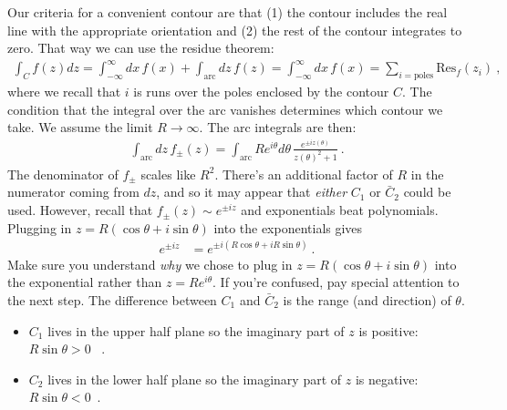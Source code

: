 Our criteria for a convenient contour are that (1) the contour includes the real line with the appropriate orientation and (2) the rest of the contour integrates to zero. That way we can use the residue theorem:
\begin{align}
  \int_C f(z) dz 
  = \int_{-\infty}^\infty dx\, f(x)
  + \int_{\text{arc}}dz\, f(z) = 
  \int_{-\infty}^\infty dx\, f(x)
  = \sum_{i=\text{poles}}\text{Res}_f(z_i) \ ,
\end{align}
where we recall that $i$ is runs over the poles enclosed by the contour $C$. The condition that the integral over the arc vanishes determines which contour we take.
We assume the limit $R\to \infty$. The arc integrals are then:
\begin{align}
  \int_{\text{arc}}
  dz \, 
  f_\pm(z)
  =
  \int_\text{arc}
  Re^{i\theta}
  d\theta \, 
  \frac{e^{\pm iz(\theta)}}{z(\theta)^2+1}
  \ .
\end{align}
The denominator of $f_\pm$ scales like $R^2$. There's an additional factor of $R$ in the numerator coming from $dz$, and so it may  appear that \emph{either} $C_1$ or $\bar C_2$ could be used. However, recall that $f_{\pm}(z)\sim e^{\pm iz}$ and exponentials beat polynomials. Plugging in $z = R(\cos\theta + i \sin\theta)$ into the exponentials gives
\begin{align}
  e^{\pm iz} &= e^{\pm i\left(R\cos\theta + i R\sin\theta\right)} \ .
\end{align}
Make sure you understand \emph{why} we chose to plug in $z = R(\cos\theta + i \sin\theta)$ into the exponential rather than $z = Re^{i\theta}$. If you're confused, pay special attention to the next step. The difference between $C_1$ and $\bar C_2$ is the range (and direction) of $\theta$. 
\begin{itemize}
  \item $C_1$ lives in the upper half plane so the imaginary part of $z$ is positive: $R\sin\theta > 0$ \ .
  \item $C_2$ lives in the lower half plane so the imaginary part of $z$ is negative: $R\sin\theta < 0$\ .  
\end{itemize}
